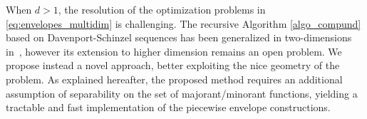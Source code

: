 \documentclass[review]{elsarticle}
\begin{document}
{When $d>1$, the resolution of the optimization problems in \eqref{eq:envelopes_multidim} is challenging. The recursive Algorithm \ref{algo_compund} based on Davenport-Schinzel sequences has been generalized in two-dimensions in~\cite{Schartz1990}, however its extension to higher dimension remains an open problem. We propose instead a novel approach, better exploiting the nice geometry of the problem. As explained hereafter, the proposed method requires an additional assumption of separability on the set of majorant/minorant functions, yielding a tractable and fast implementation of the piecewise envelope constructions. 




}
\end{document}
